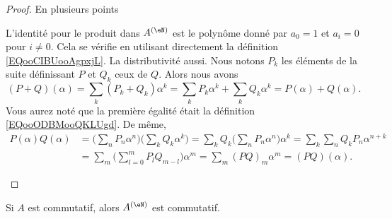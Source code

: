 \begin{proof}
	En plusieurs points
	\begin{subproof}
		\spitem[Anneau]
		L'identité pour le produit dans \( A^{(\eN)}\) est le polynôme donné par \( a_0=1\) et \( a_i=0\) pour \( i\neq 0\). Cela se vérifie en utilisant directement la définition \eqref{EQooCIBUooAgpxjL}. La distributivité aussi.
		\spitem[Le morphisme]
		Nous notons \( P_k\) les éléments de la suite définissant \( P\) et \( Q_k\) ceux de \( Q\). Alors nous avons
		\begin{equation}
			(P+Q)(\alpha)=\sum_k(P_k+Q_k)\alpha^k=\sum_kP_k\alpha^k+\sum_kQ_k\alpha^k=P(\alpha)+Q(\alpha).
		\end{equation}
		Vous aurez noté que la première égalité était la définition \eqref{EQooODBMooQKLUgd}. De même,
		\begin{subequations}
			\begin{align}
				P(\alpha)Q(\alpha) & =\big( \sum_nP_n\alpha^n \big)\big( \sum_kQ_k\alpha^k \big)=\sum_kQ_k\big( \sum_nP_n\alpha^n \big)\alpha^k=\sum_k\sum_nQ_kP_n\alpha^{n+k} \\
				                   & =\sum_m\big( \sum_{l=0}^mP_lQ_{m-l} \big)\alpha^m=\sum_m(PQ)_m\alpha^m=(PQ)(\alpha).
			\end{align}
		\end{subequations}
	\end{subproof}
\end{proof}

\begin{lemma}       \label{LEMooWVUXooQlaepO}
	Si \( A\) est commutatif, alors \( A^{(\eN)}\) est commutatif.
\end{lemma}

